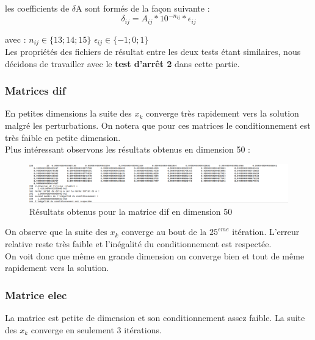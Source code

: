 \documentclass[12,french]{report}
\begin{document}
les coefficients de $\delta$A sont formés de la façon suivante :
\[
\delta_{ij}=A_{ij}*10^{-n_{ij}}*\epsilon_{ij}
\]

avec : $n_{ij}\in\{13;14;15\}$ $\epsilon_{ij}\in\{-1;0;1\}$\\
Les propriétés des fichiers de résultat entre les deux tests étant similaires, nous décidons de travailler avec le \textbf{test d'arrêt 2} dans cette partie.

\subsubsection{Matrices dif}
En petites dimensions la suite des $x_{k}$
converge très rapidement vers la solution malgré les perturbations. On notera que pour ces matrices le conditionnement est très faible en petite dimension.\\
Plus intéressant observons les résultats obtenus en dimension 50 :\\

\begin{figure}[H]
	\centering
	\includegraphics[width=1.23\textwidth]{./Images/dif_50_1.res}
	\caption{Résultats obtenus pour la matrice dif en dimension 50}
\end{figure}

On observe que la suite des $x_{k}$ converge au bout de la $25^{eme}$ itération. L'erreur relative reste très faible et l'inégalité du conditionnement est respectée.\\
On voit donc que même en grande dimension on converge bien et tout de même rapidement vers la solution.

\subsubsection{Matrice elec}
La matrice est petite de dimension et son conditionnement assez faible. La suite des $x_{k}$ converge en seulement 3 itérations.
\end{document}
